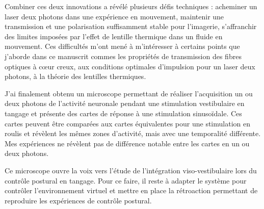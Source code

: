 Combiner ces deux innovations a révélé plusieurs défis techniques : acheminer un laser deux photons dans une expérience en mouvement, maintenir une transmission et une polarisation suffisamment stable pour l'imagerie, s'affranchir des limites imposées par l'effet de lentille thermique dans un fluide en mouvement. Ces difficultés m'ont mené à m'intéresser à certains points que j'aborde dans ce manuscrit commes les propriétés de transmission des fibres optiques à cœur creux, aux conditions optimales d'impulsion pour un laser deux photons, à la théorie des lentilles thermiques. 

J'ai finalement obtenu un microscope permettant de réaliser l'acquisition un ou deux photons de l'activité neuronale pendant une stimulation vestibulaire en tangage et présente des cartes de réponse à une stimulation sinusoïdale. Ces cartes peuvent être comparées aux cartes équivalentes pour une stimulation en roulis et révèlent les mêmes zones d'activité, mais avec une temporalité différente. Mes expériences ne révèlent pas de différence notable entre les cartes en un ou deux photons.

Ce microscope ouvre la voix vers l'étude de l'intégration viso-vestibulaire lors du contrôle postural en tangage. Pour ce faire, il reste à adapter le système pour contrôler l'environnement virtuel et mettre en place la rétroaction permettant de reproduire les expériences de contrôle postural.